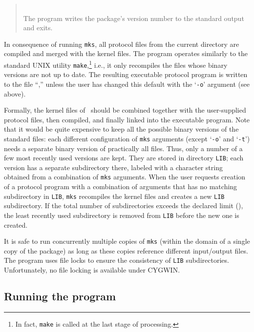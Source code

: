 \begin{quote}
\noindent{}\\ \hspace{0in}
The program writes the package's version number to the standard output and
exits.
\end{quote}\medskip

In consequence of running {\tt mks}, all protocol files from the current
directory are compiled and merged with the kernel files.
The program operates similarly to the standard UNIX utility
{\tt make},\footnote{In fact, {\tt make} is called at the last
stage of processing.} i.e.,
it only recompiles the files whose binary versions are not up to date.
The resulting executable protocol program is written to the file
``\smurphtts,'' unless the user has changed this default with the
`{\tt -o}' argument (see above).

Formally, the kernel files of \smurph\ should be combined
together with the user-supplied protocol files, then compiled, and finally
linked into the executable program.
Note that it would be quite expensive to keep all the possible binary versions
of the standard files: each different configuration of {\tt mks} arguments
(except `{\tt -o}' and `{\tt -t}')
needs a separate binary version of practically all files.
Thus, only a number of a few most recently used versions are kept.
They are stored in directory {\tt LIB}; each version has a separate
subdirectory there, labeled with a character string obtained from a
combination of {\tt mks} arguments.
When the user requests creation of a protocol program with a combination
of arguments that has no matching subdirectory in {\tt LIB}, {\tt mks}
recompiles the kernel files and creates a new {\tt LIB} subdirectory.
If the total number of subdirectories exceeds the declared limit
(), the least recently used subdirectory is removed from
{\tt LIB} before the new one is created.

It is safe to run concurrently
multiple copies of {\tt mks} (within the domain of a single
copy of the package) as long as these copies reference different input/output
files.
The program uses file locks to ensure the consistency of {\tt LIB}
subdirectories.
Unfortunately, no file locking is available under CYGWIN.

\subsection{Running the program}
\label{rm_un_ru}

